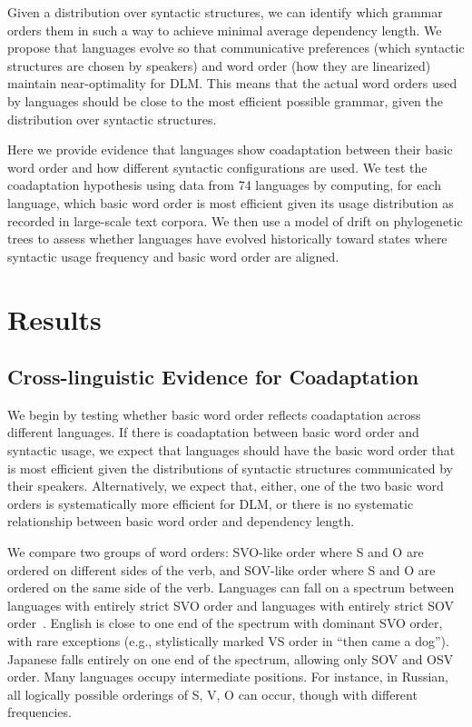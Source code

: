 \documentclass[9pt,twocolumn,twoside,lineno]{pnas-new}
\begin{document}
Given a distribution over syntactic structures, we can identify which grammar orders them in such a way to achieve minimal average dependency length.
We propose that languages evolve so that communicative preferences (which syntactic structures are chosen by speakers) and word order (how they are linearized) maintain near-optimality for DLM.
This means that the actual word orders used by languages should be close to the most efficient possible grammar, given the distribution over syntactic structures.

Here we provide evidence that languages show coadaptation between their basic word order and how different syntactic configurations are used.
We test the coadaptation hypothesis using data from 74 languages by computing, for each language, which basic word order is most efficient given its usage distribution as recorded in large-scale text corpora.
We then use a model of drift on phylogenetic trees to assess whether languages have evolved historically toward states where syntactic usage frequency and basic word order are aligned.



\section*{Results}

\subsection*{Cross-linguistic Evidence for Coadaptation}

We begin by testing whether basic word order reflects coadaptation across different languages.
If there is coadaptation between basic word order and syntactic usage, we expect that languages should have the basic word order that is most efficient given the distributions of syntactic structures communicated by their speakers.
Alternatively, we expect that, either, one of the two basic word orders is systematically more efficient for DLM, or there is no systematic relationship between basic word order and dependency length.


We compare two groups of word orders: SVO-like order where S and O are ordered on different sides of the verb, and SOV-like order where S and O are ordered on the same side of the verb.
Languages can fall on a spectrum between languages with entirely strict SVO order and languages with entirely strict SOV order~\citep{steele1978word}.
English is close to one end of the spectrum with dominant SVO order, with rare exceptions (e.g., stylistically marked VS order in ``then came a dog'').
Japanese falls entirely on one end of the spectrum, allowing only SOV and OSV order.
Many languages occupy intermediate positions. 
For instance, in Russian, all logically possible orderings of S, V, O can occur, though with different frequencies.
\end{document}

